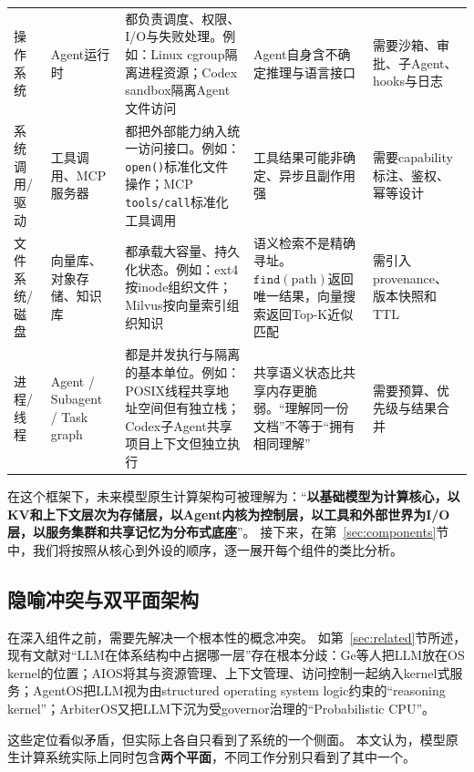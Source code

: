\begin{longtable}{p{}p{}p{}p{}p{}}
操作系统 & Agent运行时 & 都负责调度、权限、I/O与失败处理。例如：Linux cgroup隔离进程资源\cite{linux_cgroup_2026}；Codex sandbox隔离Agent文件访问\cite{openai_codex_sandbox_2026} & Agent自身含不确定推理与语言接口 & 需要沙箱、审批、子Agent、hooks与日志 \\[3pt]

系统调用/驱动 & 工具调用、MCP服务器 & 都把外部能力纳入统一访问接口。例如：\texttt{open()}标准化文件操作；MCP \texttt{tools/call}标准化工具调用\cite{mcp_intro_2026} & 工具结果可能非确定、异步且副作用强 & 需要capability标注、鉴权、幂等设计 \\[3pt]

文件系统/磁盘 & 向量库、对象存储、知识库 & 都承载大容量、持久化状态。例如：ext4按inode组织文件；Milvus按向量索引组织知识\cite{lewis2020rag} & 语义检索不是精确寻址。$\texttt{find}(\text{path})$返回唯一结果，向量搜索返回Top-K近似匹配 & 需引入provenance、版本快照和TTL \\[3pt]

进程/线程 & Agent / Subagent / Task graph & 都是并发执行与隔离的基本单位。例如：POSIX线程共享地址空间但有独立栈；Codex子Agent共享项目上下文但独立执行 & 共享语义状态比共享内存更脆弱。``理解同一份文档''不等于``拥有相同理解'' & 需要预算、优先级与结果合并 \\

\bottomrule
\end{longtable}
\renewcommand{\arraystretch}{1.0}
\normalsize

在这个框架下，未来模型原生计算架构可被理解为：``\textbf{以基础模型为计算核心，以KV和上下文层次为存储层，以Agent内核为控制层，以工具和外部世界为I/O层，以服务集群和共享记忆为分布式底座}''。
接下来，在第~\ref{sec:components}节中，我们将按照从核心到外设的顺序，逐一展开每个组件的类比分析。

\subsection{隐喻冲突与双平面架构}

在深入组件之前，需要先解决一个根本性的概念冲突。
如第~\ref{sec:related}节所述，现有文献对``LLM在体系结构中占据哪一层''存在根本分歧：Ge等人把LLM放在OS kernel的位置\cite{ge2023llmos}；AIOS将其与资源管理、上下文管理、访问控制一起纳入kernel式服务\cite{mei2024aios}；AgentOS把LLM视为由structured operating system logic约束的``reasoning kernel''\cite{agentos2025}；ArbiterOS又把LLM下沉为受governor治理的``Probabilistic CPU''\cite{arbiteros2025}。

这些定位看似矛盾，但实际上各自只看到了系统的一个侧面。
本文认为，模型原生计算系统实际上同时包含\textbf{两个平面}，不同工作分别只看到了其中一个。

